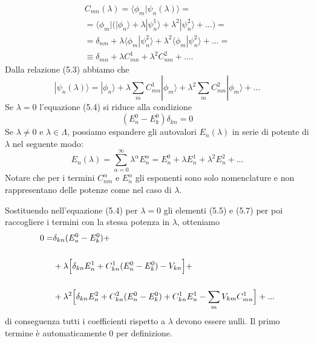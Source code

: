 \begin{equation}
\begin{array}{l}
C_{mn} ( \lambda)   = \langle \phi_m|\psi_n(\lambda) \rangle = \\[0.5cm]
 = \langle \phi_m | \Big( |\phi_n \rangle + \lambda |\psi_n^1 \rangle + \lambda^2|\psi_n ^2 \rangle + ... \Big ) = \\[0.5cm]
 = \delta_{nm} + \lambda \langle \phi_m|\psi_{n}^2 \rangle +  \lambda^2 \langle \phi_m| \psi_n^2 \rangle + ... = \\[0.5cm]
 \equiv \delta_{mn} + \lambda C_{mn}^1 + \lambda^2 C_{nm}^2 + ....   
\end{array}
\end{equation}
Dalla relazione (5.3) abbiamo che 
\begin{equation}
	|\psi_n ( \lambda) \rangle = |\phi_n \rangle + \lambda \sum_{m} C_{mn}^1|\phi_m \rangle + \lambda^2 \sum_{m} C_{mn}^2|\phi_m \rangle + ...
\end{equation}
Se $\lambda = 0$ l'equazione (5.4) si riduce alla condizione 
\begin{equation*}
	(E_n^0 - E_k^0)\delta_{kn} = 0
\end{equation*} 
Se $\lambda \neq 0$ e $\lambda \in \Lambda$, possiamo espandere gli autovalori $E_n(\lambda)$ in serie di potente di $\lambda$ nel seguente modo:
\begin{equation}
	E_n(\lambda) =\sum_{\alpha = 0}^{\infty} \lambda^\alpha E_{n}^{\alpha} = E_{n}^0 + \lambda E_n^1 + \lambda^2 E_n^2 + ... 
\end{equation}
Notare che per i termini $C_{nm}^\alpha$ e $E_n^\alpha$ gli esponenti sono solo nomenclature e non rappresentano delle potenze come nel caso di $\lambda$.

Sostituendo nell'equazione (5.4) per $\lambda = 0$  gli elementi (5.5) e (5.7) per poi raccogliere i termini con la stessa potenza in $\lambda$, otteniamo 
\begin{align}
	0  = & \delta_{kn} (E_n^0 - E_k^0) +  \notag \\[0.5cm] 
		& + \lambda \Big [ \delta_{kn}E_{n}^1 + C^1_{kn}(E^0_n-E_k^0) -V_{kn} \Big] + \notag \\[0.5cm]
		& + \lambda^2 \Big [ \delta_{kn}E^2_{n} + C^2_{kn}(E_n^0 - E_{k}^0) + C_{kn}^1E_n^1 - \sum_{m}V_{km}C_{mn}^1 \Big] + ...
\end{align}
di conseguenza tutti i coefficienti rispetto a $\lambda$ devono essere nulli. Il primo termine \`e automaticamente 0 per definizione. 

